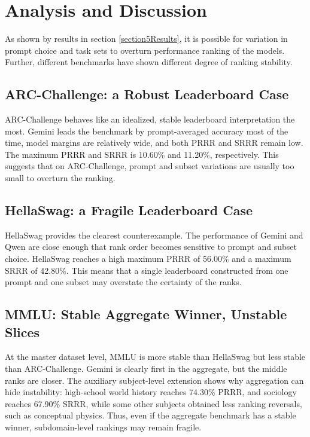 \documentclass[11pt]{article}
\theoremstyle{definition}
\begin{document}
\section{Analysis and Discussion}

As shown by results in section \ref{section5Results}, it is possible for variation in prompt choice and task sets to overturn performance ranking of the models. Further, different benchmarks have shown different degree of ranking stability.

\subsection{ARC-Challenge: a Robust Leaderboard Case}

ARC-Challenge behaves like an idealized, stable leaderboard interpretation the most. Gemini leads the benchmark by prompt-averaged accuracy most of the time, model margins are relatively wide, and both PRRR and SRRR remain low. The maximum PRRR and SRRR is 10.60\% and 11.20\%, respectively. This suggests that on ARC-Challenge, prompt and subset variations are usually too small to overturn the ranking.

\subsection{HellaSwag: a Fragile Leaderboard Case}

HellaSwag provides the clearest counterexample. The performance of Gemini and Qwen are close enough that rank order becomes sensitive to prompt and subset choice. HellaSwag reaches a high maximum PRRR of 56.00\% and a maximum SRRR of 42.80\%. This means that a single leaderboard constructed from one prompt and one subset may overstate the certainty of the ranks.

\subsection{MMLU: Stable Aggregate Winner, Unstable Slices}

At the master dataset level, MMLU is more stable than HellaSwag but less stable than ARC-Challenge. Gemini is clearly first in the aggregate, but the middle ranks are closer. The auxiliary subject-level extension shows why aggregation can hide instability: high-school world history reaches 74.30\% PRRR, and sociology reaches 67.90\% SRRR, while some other subjects obtained less ranking reversals, such as conceptual physics. Thus, even if the aggregate benchmark has a stable winner, subdomain-level rankings may remain fragile.
\end{document}
